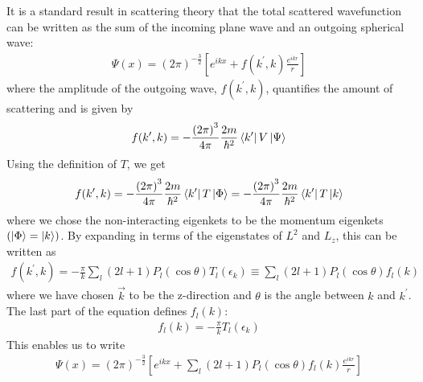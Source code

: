 \documentclass[twoside]{report}
\numberwithin{equation}{section}
\begin{document}
It is a standard result in scattering theory that the total scattered wavefunction can be written as the sum of the incoming plane wave and an outgoing spherical wave:
\begin{equation}\begin{aligned}
	\Psi(x) = \left(2\pi\right)^{-\frac{3}{2}}\left[e^{ikx} + f(k^\prime, k) \frac{e^{ikr}}{r}\right]
\end{aligned}\end{equation}
where the amplitude of the outgoing wave, \(f(k^\prime,k)\), quantifies the amount of scattering and is given by
\begin{equation}\begin{aligned}
	f(k^\prime, k) = - \frac{\left( 2\pi \right) ^3}{4\pi} \frac{2m}{\hbar^2}\bra{k^\prime}V\ket{\Psi}
\end{aligned}\end{equation}
Using the definition of \(T\), we get
\begin{equation}\begin{aligned}
\label{f_in_T}
f(k^\prime,k) = - \frac{\left( 2\pi \right) ^3}{4\pi} \frac{2m}{\hbar^2}\bra{k^\prime}T\ket{\Phi} = -\frac{\left( 2\pi \right) ^3}{4\pi} \frac{2m}{\hbar^2}\bra{k^\prime}T\ket{k}
\end{aligned}\end{equation}
where we chose the non-interacting eigenkets to be the momentum eigenkets \(\left( \ket{\Phi} = \ket{k} \right) \). By expanding in terms of the eigenstates of \(L^2\) and \(L_z\), this can be written as
\begin{equation}\begin{aligned}
	f(k^\prime,k) = - \frac{\pi}{k}\sum_l (2l+1)P_l\left( \cos \theta \right) T_l(\epsilon_k) \equiv \sum_l (2l+1)P_l\left( \cos \theta \right) f_l\left( k \right) 
\end{aligned}\end{equation}
where we have chosen \(\vec k\) to be the z-direction and \(\theta\) is the angle between \(k\) and \(k^\prime\). The last part of the equation defines \(f_l(k)\):
\begin{equation}\begin{aligned}
	f_l(k) = - \frac{\pi}{k} T_l(\epsilon_k)
\end{aligned}\end{equation}
This enables us to write
\begin{equation}\begin{aligned}
	\Psi(x) = \left(2\pi\right)^{-\frac{3}{2}}\left[e^{ikx} + \sum_l (2l+1)P_l\left( \cos \theta \right) f_l\left(k\right) \frac{e^{ikr}}{r}\right]
\end{aligned}\end{equation}
\end{document}

